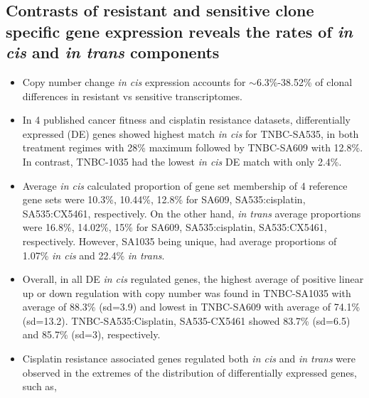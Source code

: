 \subsection{Contrasts of resistant and sensitive clone specific gene 
expression reveals the rates of \textit{in cis} and \textit{in trans} components} 
\begin{itemize}
   
   \item Copy number change \textit{in cis} expression accounts for $\sim${6.3\%-38.52\%} of clonal differences in resistant vs sensitive transcriptomes. 
 
 
 
 
 \item  In 4 published cancer fitness and cisplatin resistance datasets, differentially expressed (DE) genes showed highest match \textit{in cis} for TNBC-SA535, in both treatment regimes with 28\% maximum followed by TNBC-SA609 with 12.8\%. In contrast, TNBC-1035 had the lowest \textit{in cis} DE match with only 2.4\%.

 \item Average \textit{in cis} calculated proportion of gene set membership of  4 reference gene sets were 10.3\%, 10.44\%, 12.8\% for SA609, SA535:cisplatin, SA535:CX5461, respectively. On the other hand, \textit{in trans} average proportions were 16.8\%, 14.02\%, 15\% for SA609, SA535:cisplatin, SA535:CX5461, respectively. However, SA1035 being unique, had average proportions of 1.07\% \textit{in cis} and 22.4\% \textit{in trans}.

 \item Overall, in all DE \textit{in cis} regulated genes, the highest average of positive linear up or down regulation with copy number was found in TNBC-SA1035 with average of 88.3\% (sd=3.9) and lowest in TNBC-SA609 with average of 74.1\% (sd=13.2). 
 TNBC-SA535:Cisplatin, SA535-CX5461 showed 83.7\% (sd=6.5) and  85.7\% (sd=3), respectively.
 
 \item Cisplatin resistance associated genes regulated both \textit{in cis} and \textit{in trans} were observed in the extremes of the distribution of differentially expressed genes, such as,
 

\end{itemize}
